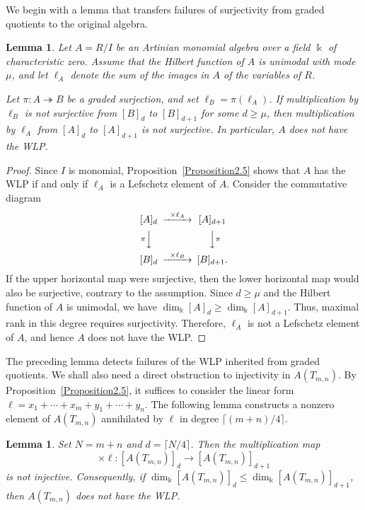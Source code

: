 \documentclass[12pt,twoside]{amsart}
\newtheorem{lemma}[thm]{Lemma}
\theoremstyle{definition}
\theoremstyle{mystyle}
\begin{document}
We begin with a lemma that transfers failures of surjectivity
from graded quotients to the original algebra.

\begin{lemma}\label{lem:failure_transfer}
Let $A=R/I$ be an Artinian monomial algebra over a field $\Bbbk$ of
characteristic zero. Assume that the Hilbert function of $A$ is
unimodal with mode $\mu$, and let $\ell_A$ denote the sum of the images
in $A$ of the variables of $R$.

Let $\pi:A\twoheadrightarrow B$ be a graded surjection, and set
$\ell_B=\pi(\ell_A)$. If multiplication by $\ell_B$ is not surjective from $[B]_d$ to
$[B]_{d+1}$ for some $d\geq\mu$, then multiplication by $\ell_A$ from
$[A]_d$ to $[A]_{d+1}$ is not surjective. In particular, $A$ does not
have the WLP.
\end{lemma}

\begin{proof}
Since $I$ is monomial, Proposition~\ref{Proposition2.5} shows that $A$
has the WLP if and only if $\ell_A$ is a Lefschetz element of $A$.
Consider the commutative diagram
\begin{equation*}
\begin{CD}
[A]_d @>{\times\ell_A}>> [A]_{d+1}\\
@V{\pi}VV @VV{\pi}V\\
[B]_d @>{\times\ell_B}>> [B]_{d+1}.
\end{CD}
\end{equation*}
If the upper horizontal map were surjective, then the lower horizontal
map would also be surjective, contrary to the assumption. Since
$d\geq\mu$ and the Hilbert function of $A$ is unimodal, we have
$\dim_{\Bbbk}[A]_d\geq\dim_{\Bbbk}[A]_{d+1}$. Thus, maximal rank in
this degree requires surjectivity. Therefore, $\ell_A$ is not a
Lefschetz element of $A$, and hence $A$ does not have the WLP.
\end{proof}

The preceding lemma detects failures of the WLP inherited from graded
quotients. We shall also need a direct obstruction to injectivity in
$A(T_{m,n})$. By Proposition~\ref{Proposition2.5}, it suffices to
consider the linear form
$\ell=x_1+\cdots+x_m+y_1+\cdots+y_n$.
The following lemma constructs a nonzero element of $A(T_{m,n})$
annihilated by $\ell$ in degree $\lceil(m+n)/4\rceil$.

\begin{lemma}\label{lem:block-annihilator}
Set $N=m+n$ and $d=\lceil N/4\rceil$. Then the multiplication map
\begin{equation*}
\times\ell:[A(T_{m,n})]_d\longrightarrow[A(T_{m,n})]_{d+1}
\end{equation*}
is not injective. Consequently, if
$\dim_{\Bbbk}[A(T_{m,n})]_d\leq
\dim_{\Bbbk}[A(T_{m,n})]_{d+1}$, then $A(T_{m,n})$ does not have the
WLP.
\end{lemma}
\end{document}
